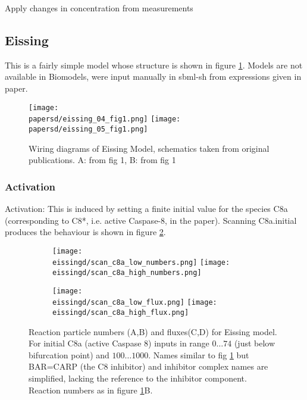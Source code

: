 \documentclass[a4paper,10pt]{report}
\newcommand{\papersd}{/home/ngrs2/work/bsu/papers/psoriasis}
\newcommand{\psortbase}{/home/ngrs2/work/bsu/PSORT_Zuliani_Reynolds/}
\newcommand{\apobase}{\psortbase/apoptosis/}
\newcommand{\eissingd}{\apobase/eissing/}
\begin{document}
Apply changes in concentration from measurements 

\subsection{Eissing}

This is a fairly simple model whose structure is shown in figure \ref{fig:eissing_wiring}. Models are not available in Biomodels, were input manually in sbml-sh from expressions given in paper\cite{eissing2004bistability}. 

\begin{figure}[h!]
  \subcaptionbox{}
  {\texttt{[image: \\papersd/eissing\_04\_fig1.png]}}
  \subcaptionbox{}
  {\texttt{[image: \\papersd/eissing\_05\_fig1.png]}}
  \caption{Wiring diagrams of Eissing Model, schematics taken from original publications. A: from \cite{eissing2004bistability} fig 1, B: from \cite{eissing2005robustness} fig 1} 
  \label{fig:eissing_wiring}
\end{figure}

\subsubsection{Activation}

Activation: This is induced by setting a finite initial value for the species C8a (corresponding to C8*, i.e. active Caspase-8, in the paper). 
Scanning C8a.initial produces the behaviour is shown in figure \ref{fig:eissing_scanc8a}.

\begin{figure}[h!]
  \begin{subfigure}{\textwidth}
    \subcaptionbox{}
    {\texttt{[image: \\eissingd/scan\_c8a\_low\_numbers.png]}}
    \subcaptionbox{}
    {\texttt{[image: \\eissingd/scan\_c8a\_high\_numbers.png]}}
  \end{subfigure}
  \begin{subfigure}{\textwidth}
    \subcaptionbox{}
    {\texttt{[image: \\eissingd/scan\_c8a\_low\_flux.png]}}
    \subcaptionbox{}
    {\texttt{[image: \\eissingd/scan\_c8a\_high\_flux.png]}}
  \end{subfigure}
  \caption{Reaction particle numbers (A,B) and fluxes(C,D) for Eissing model. For initial C8a (active Caspase 8) inputs in range $0\ldots74$ (just below bifurcation point) and $100\ldots1000$. Names similar to fig \ref{fig:eissing_wiring} but BAR=CARP (the C8 inhibitor) and inhibitor complex names are simplified, lacking the reference to the inhibitor component. Reaction numbers as in figure \ref{fig:eissing_wiring}B.}
  \label{fig:eissing_scanc8a}
\end{figure}
\end{document}
